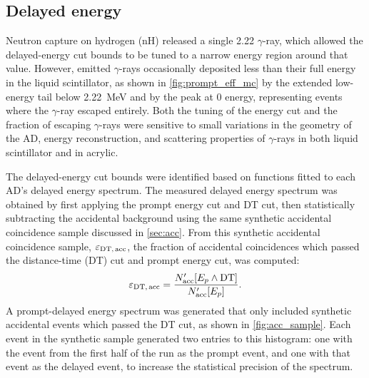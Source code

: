 \subsection{Delayed energy}
\label{subsec:delayed}

Neutron capture on hydrogen (nH) released a single
\SI{2.22}{\mev} $\gamma$-ray,
which allowed the delayed-energy cut bounds to be tuned to a narrow energy region
around that value.
However, emitted $\gamma$-rays occasionally
deposited less than their full energy in the liquid scintillator,
as shown in \cref{fig:prompt_eff_mc} by the extended low-energy tail
below \SI{2.22}{\MeV} and by the peak at 0 energy,
representing events where the $\gamma$-ray escaped entirely.
Both the tuning of the energy cut
and the fraction of escaping $\gamma$-rays were sensitive to
small variations in the geometry of the AD, energy reconstruction,
and scattering properties of $\gamma$-rays in
both liquid scintillator and in acrylic.

The delayed-energy cut bounds were identified based on
functions fitted to each AD's delayed energy spectrum.
The measured delayed energy spectrum was obtained by first applying
the prompt energy cut and DT cut,
then statistically subtracting the accidental background
using the same synthetic accidental coincidence sample
discussed in \cref{sec:acc}.
From this synthetic accidental coincidence sample, $\varepsilon_{\text{DT,\,acc}}$,
the fraction of accidental  coincidences which passed the distance-time (DT) cut
and prompt energy cut, was computed:
\begin{equation}\label{eq:eps_DT_acc}
    \varepsilon_{\text{DT,\,acc}} =
    \frac{N_\text{acc}'[E_p \wedge \text{DT}]}{N_\text{acc}'[E_p]}.
\end{equation}
A prompt-delayed energy spectrum was generated that only included
synthetic accidental events which passed the DT cut,
as shown in \cref{fig:acc_sample}.
Each event in the synthetic sample generated two entries to this histogram:
one with the event from the first half of the run as the prompt event,
and one with that event as the delayed event,
to increase the statistical precision of the spectrum.

